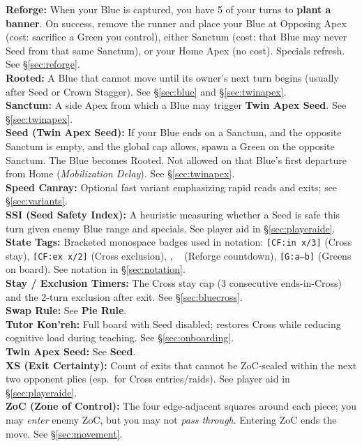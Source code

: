 \documentclass[11pt]{article}
\newcommand{\RoC}{\textcolor{teal!60!black}{\scriptsize\ttfamily[Rooted]}}
\newcommand{\RC}{\textcolor{purple!70!black}{\scriptsize\ttfamily[RC]}}
\renewcommand{\RC}[1][]{%
  \textcolor{purple!70!black}{\scriptsize\ttfamily[RC%
  \if\relax\detokenize{#1}\relax\else~#1\fi]}}
\begin{document}
\textbf{Reforge:} When your Blue is captured, you have 5 of your turns to \textbf{plant a banner}. On success, remove the runner and place your Blue at Opposing Apex (cost: sacrifice a Green you control), either Sanctum (cost: that Blue may never Seed from that same Sanctum), or your Home Apex (no cost). Specials refresh. See \S\ref{sec:reforge}.\\

\textbf{Rooted:} A Blue that cannot move until its owner’s next turn begins (usually after Seed or Crown Stagger). See \S\ref{sec:blue} and \S\ref{sec:twinapex}.\\

\textbf{Sanctum:} A side Apex from which a Blue may trigger \textbf{Twin Apex Seed}. See \S\ref{sec:twinapex}.\\

\textbf{Seed (Twin Apex Seed):} If your Blue ends on a Sanctum, and the opposite Sanctum is empty, and the global cap allows, spawn a Green on the opposite Sanctum. The Blue becomes Rooted. Not allowed on that Blue’s first departure from Home (\emph{Mobilization Delay}). See \S\ref{sec:twinapex}.\\

\textbf{Speed Canray:} Optional fast variant emphasizing rapid reads and exits; see \S\ref{sec:variants}.\\

\textbf{SSI (Seed Safety Index):} A heuristic measuring whether a Seed is safe this turn given enemy Blue range and specials. See player aid in \S\ref{sec:playeraide}.\\

\textbf{State Tags:} Bracketed monospace badges used in notation: \texttt{[CF:in x/3]} (Cross stay), \texttt{[CF:ex x/2]} (Cross exclusion), \texttt{\RoC}, \texttt{\RC[3/5]} (Reforge countdown), \texttt{[G:a--b]} (Greens on board). See notation in \S\ref{sec:notation}.\\

\textbf{Stay / Exclusion Timers:} The Cross stay cap (3 consecutive ends-in-Cross) and the 2-turn exclusion after exit. See \S\ref{sec:bluecross}.\\

\textbf{Swap Rule:} See \textbf{Pie Rule}.\\

\textbf{Tutor Kon'reh:} Full board with Seed disabled; restores Cross while reducing cognitive load during teaching. See \S\ref{sec:onboarding}.\\

\textbf{Twin Apex Seed:} See \textbf{Seed}.\\

\textbf{XS (Exit Certainty):} Count of exits that cannot be ZoC-sealed within the next two opponent plies (esp.\ for Cross entries/raids). See player aid in \S\ref{sec:playeraide}.\\

\textbf{ZoC (Zone of Control):} The four edge-adjacent squares around each piece; you may \emph{enter} enemy ZoC, but you may not \emph{pass through}. Entering ZoC ends the move. See \S\ref{sec:movement}.\\
\end{document}
